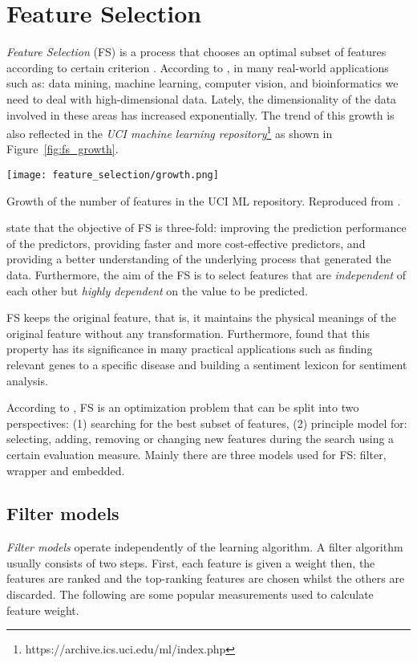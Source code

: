 \chapter{Feature Selection}
\label{ch:feature-selection}

\textit{Feature Selection} (FS) is a process that chooses an optimal subset of features according to certain criterion \citep{liu2012feature}. According to \citet{sammut2017encyclopedia}, in many real-world applications such as: data mining, machine learning, computer vision, and bioinformatics we need to deal with high-dimensional data. Lately, the dimensionality of the data involved in these areas has increased exponentially. The trend of this growth is also reflected in the \textit{UCI machine learning repository}\footnote{https://archive.ics.uci.edu/ml/index.php} as shown in Figure~\ref{fig:fs_growth}.

\begin{marginfigure}
  \texttt{[image: feature\_selection/growth.png]}
  \caption{Growth of the number of features in the UCI ML repository. Reproduced from \citet{sammut2017encyclopedia}.}
  \label{fig:fs_growth}
\end{marginfigure}

\citet{guyon2003introduction} state that the objective of FS is three-fold: improving the prediction performance of the predictors, providing faster and more cost-effective predictors, and providing a better understanding of the underlying process that generated the data. Furthermore, the aim of the FS is to select features that are \textit{independent} of each other but \textit{highly dependent} on the value to be predicted.

FS keeps the original feature, that is, it maintains the physical meanings of the original feature without any transformation. Furthermore, \citet{masaeli2010transformation} found that this property has its significance in many practical applications such as finding relevant genes to a specific disease and building a sentiment lexicon for sentiment analysis.

According to \citet{zhao2010advancing}, FS is an optimization problem that can be split into two perspectives: (1) searching for the best subset of features, (2) principle model for: selecting, adding, removing or changing new features during the search using a certain evaluation measure. Mainly there are three models used for FS: filter, wrapper and embedded.

\section{Filter models}\label{sec:fs_filter}
\textit{Filter models} operate independently of the learning algorithm. A filter algorithm usually consists of two steps. First, each feature is given a weight then, the features are ranked and the top-ranking features are chosen whilst the others are discarded. The following are some popular measurements used to calculate feature weight.

